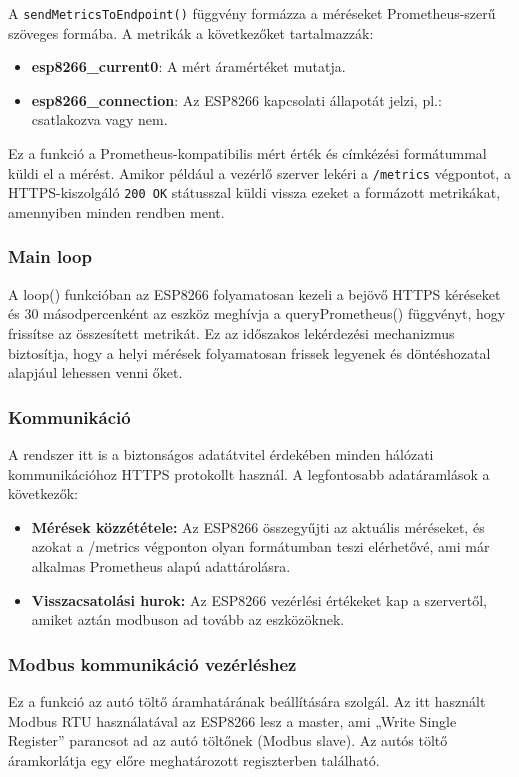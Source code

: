A \texttt{sendMetricsToEndpoint()} függvény formázza a méréseket Prometheus-szerű szöveges formába. A metrikák a következőket tartalmazzák:

\begin{itemize}
  \item \textbf{esp8266\_current0}: A mért áramértéket mutatja.
  \item \textbf{esp8266\_connection}: Az ESP8266 kapcsolati állapotát jelzi, pl.: csatlakozva vagy nem.
\end{itemize}

Ez a funkció a Prometheus-kompatibilis mért érték és címkézési formátummal küldi el a mérést. 
Amikor például a vezérlő szerver lekéri a \texttt{/metrics} végpontot, a HTTPS-kiszolgáló 
\texttt{200 OK} státusszal küldi vissza ezeket a formázott metrikákat, amennyiben minden rendben ment.

\subsubsection{Main loop}
A loop() funkcióban az ESP8266 folyamatosan kezeli a bejövő HTTPS kéréseket és 30 másodpercenként 
az eszköz meghívja a queryPrometheus() függvényt, hogy frissítse az összesített metrikát. 
Ez az időszakos lekérdezési mechanizmus biztosítja, hogy a helyi mérések folyamatosan frissek 
legyenek és döntéshozatal alapjául lehessen venni őket.

\subsubsection{Kommunikáció}
A rendszer itt is a biztonságos adatátvitel érdekében minden hálózati kommunikációhoz HTTPS protokollt használ. 
A legfontosabb adatáramlások a következők:

\begin{itemize}
    \item \textbf{Mérések közzététele:} Az ESP8266 összegyűjti az aktuális méréseket, és azokat a /metrics 
    végponton olyan formátumban teszi elérhetővé, ami már alkalmas Prometheus alapú adattárolásra.
    
    \item \textbf{Visszacsatolási hurok:} Az ESP8266 vezérlési értékeket kap a szervertől, amiket aztán modbuson 
    ad tovább az eszközöknek.
\end{itemize}

\subsubsection{Modbus kommunikáció vezérléshez}
Ez a funkció az autó töltő áramhatárának beállítására szolgál. 
Az itt használt Modbus RTU használatával az ESP8266 lesz a master, ami „Write Single Register” 
parancsot ad az autó töltőnek (Modbus slave). Az autós töltő áramkorlátja egy előre meghatározott 
regiszterben található.

